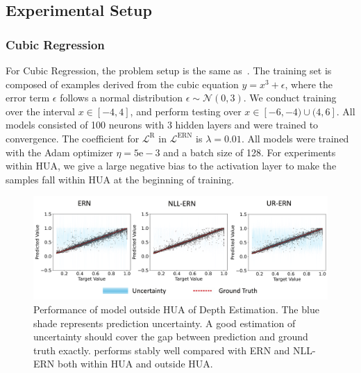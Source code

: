 \subsection{Experimental Setup}
\label{appendix_21}
\subsubsection{Cubic Regression}For Cubic Regression, the problem setup is the same as~\citeauthor{NEURIPS2020_aab08546}.
The training set is composed of examples derived from the cubic equation $y=x^3+\epsilon$, where the error term $\epsilon$ follows a normal distribution $\epsilon \sim \mathcal{N}(0,3)$. We conduct training over the interval $x \in[-4,4]$, and perform testing over $x \in[-6,-4) \cup(4,6]$. All models consisted of 100 neurons with 3 hidden layers and were trained to convergence. The coefficient for $\mathcal{L}^{\mathrm{R}}$ in $\mathcal{L}^{\mathrm{ERN}}$ is $\lambda=0.01$. All models were trained with the Adam optimizer $\eta=5 \mathrm{e}-3$ and a batch size of 128. For experiments within HUA, we give a large negative bias to the activation layer to make the samples fall within HUA at the beginning of training.

\begin{figure}
\centering
\includegraphics[width=0.9\columnwidth]{depth_outside_HUA_appen.png} 
\caption{Performance of model outside HUA of Depth Estimation. The blue shade represents prediction uncertainty. A good estimation of uncertainty should cover the gap between prediction and ground truth exactly. \ours performs stably well compared with ERN and NLL-ERN both within HUA and outside HUA.}
\label{depth_outside_HUA_appen}
\end{figure}


